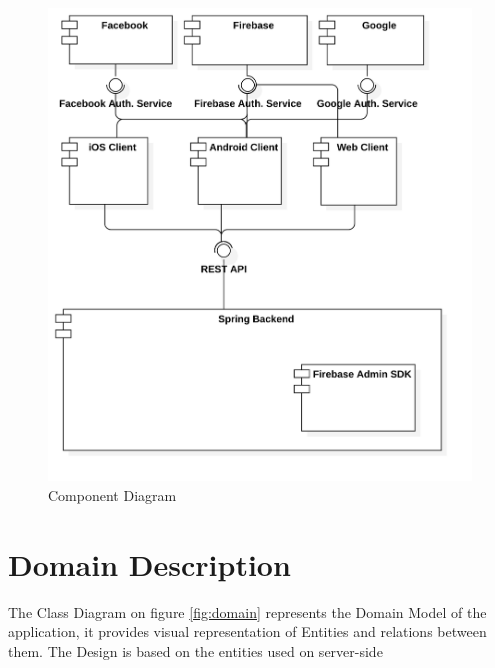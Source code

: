 \documentclass[thesis=B,english]{FITthesis}[2012/10/20]
\begin{document}
\begin{figure}[H]
	\centering
  \includegraphics[scale=0.25]{systemdiagram}
  \caption{Component Diagram}
  \label{fig:component}
\end{figure}



\newpage
\section{Domain Description}
 The Class Diagram on figure \ref{fig:domain} represents the Domain Model of the application, it provides visual representation of Entities and relations between them. The Design is based on the entities used on server-side
\end{document}
